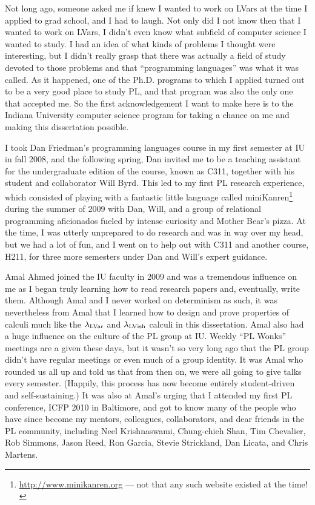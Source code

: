 Not long ago, someone asked me if knew I wanted to work on LVars at
the time I applied to grad school, and I had to laugh.  Not only did I
not know then that I wanted to work on LVars, I didn't even know what
subfield of computer science I wanted to study.  I had an idea of what
kinds of problems I thought were interesting, but I didn't really
grasp that there was actually a field of study devoted to those
problems and that ``programming languages'' was what it was called.
As it happened, one of the Ph.D. programs to which I applied turned
out to be a very good place to study PL, and that program was also the
only one that accepted me.  So the first acknowledgement I want to
make here is to the Indiana University computer science program for
taking a chance on me and making this dissertation possible.

I took Dan Friedman's programming languages course in my first
semester at IU in fall 2008, and the following spring, Dan invited me
to be a teaching assistant for the undergraduate edition of the
course, known as C311, together with his student and collaborator Will
Byrd.  This led to my first PL research experience, which consisted of
playing with a fantastic little language called
miniKanren\footnote{\url{http://www.minikanren.org} --- not that any
such website existed at the time!} during the summer of 2009 with Dan,
Will, and a group of relational programming aficionados fueled by
intense curiosity and Mother Bear's pizza.  At the time, I was utterly
unprepared to do research and was in way over my head, but we had a
lot of fun, and I went on to help out with C311 and another course,
H211, for three more semesters under Dan and Will's expert guidance.

Amal Ahmed joined the IU faculty in 2009 and was a tremendous
influence on me as I began truly learning how to read research papers
and, eventually, write them.  Although Amal and I never worked on
determinism as such, it was nevertheless from Amal that I learned how
to design and prove properties of calculi much like the $\lambda_{\textrm{LVar}}$
and $\lambda_{\textrm{LVish}}$ calculi in this dissertation.  Amal also had a huge
influence on the culture of the PL group at IU.  Weekly ``PL Wonks''
meetings are a given these days, but it wasn't so very long ago that
the PL group didn't have regular meetings or even much of a group
identity.  It was Amal who rounded us all up and told us that from
then on, we were all going to give talks every semester.  (Happily,
this process has now become entirely student-driven and
self-sustaining.)  It was also at Amal's urging that I attended my
first PL conference, ICFP 2010 in Baltimore, and got to know many of
the people who have since become my mentors, colleagues,
collaborators, and dear friends in the PL community, including Neel
Krishnaswami, Chung-chieh Shan, Tim Chevalier, Rob Simmons, Jason
Reed, Ron Garcia, Stevie Strickland, Dan Licata, and Chris Martens.

